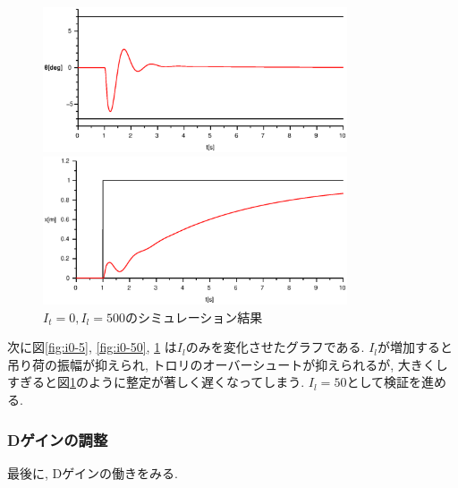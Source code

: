 \documentclass[titlepage]{jsarticle}
\begin{document}
            \begin{figure}[h]
                \begin{minipage}{0.5\hsize}
                    \centering
                    \includegraphics[width=9cm]{img/I0-500t.eps}
                \end{minipage}
                \begin{minipage}{0.5\hsize}
                    \centering
                    \includegraphics[width=9cm]{img/I0-500x.eps}
                \end{minipage}
                \caption{$I_t = 0, I_l = 500$のシミュレーション結果}
                \label{fig:i0-500}
            \end{figure}

            次に図\ref{fig:i0-5}, \ref{fig:i0-50}, \ref{fig:i0-500}
            は$I_l$のみを変化させたグラフである.
            $I_l$が増加すると吊り荷の振幅が抑えられ,
            トロリのオーバーシュートが抑えられるが,
            大きくしすぎると図\ref{fig:i0-500}のように整定が著しく遅くなってしまう.
            $I_l = 50$として検証を進める.

        \subsubsection{Dゲインの調整}
            最後に, Dゲインの働きをみる.
\end{document}
